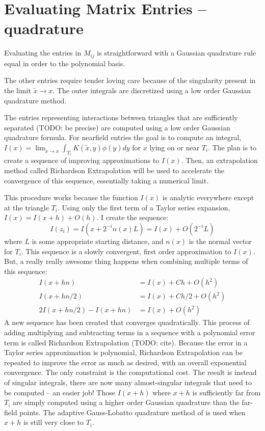 \documentclass[a4paper]{article}
\begin{document}
\section*{Evaluating Matrix Entries -- quadrature}
Evaluating the entries in $M_{ij}$ is straightforward with a Gaussian quadrature rule equal in order to the polynomial basis. 

The other entries require tender loving care because of the singularity present in the limit $\tilde{x} \to x$.
The outer integrals are discretized using a low order Gaussian quadrature method. 

The entries representing interactions between triangles that are sufficiently separated (TODO: be precise) are computed using a low order Gaussian quadrature formula. For nearfield entries the goal is to compute an integral, $I(x) = \lim_{\tilde{x}\to x}\int_{T_i}K(\tilde{x},y)\phi(y)dy$ for $x$ lying on or near $T_i$. The plan is to create a sequence of improving approximations to $I(x)$. Then, an extrapolation method called Richardson Extrapolation will be used to accelerate the convergence of this sequence, essentially taking a numerical limit. 

This procedure works because the function $I(x)$ is analytic everywhere except at the triangle $T_i$. Using only the first term of a Taylor series expansion, $I(x) = I(x + h) + O(h)$. I create the sequence:
\begin{equation}
    I(z_i) = I(x + 2^{-i}n(x)L) = I(x) + O(2^{-i}L)
\end{equation}
where $L$ is some appropriate starting distance, and $n(x)$ is the normal vector for $T_i$. This sequence is a slowly convergent, first order approximation to $I(x)$. But, a really really awesome thing happens when combining multiple terms of this sequence: 
\begin{align}
I(x + hn) &= I(x) + Ch + O(h^2)\\
I(x + hn/2) &= I(x) + Ch/2 + O(h^2)\\
2I(x + hn/2) - I(x + hn) &= I(x) + O(h^2)
\end{align}
A new sequence has been created that converges quadratically. This process of adding multiplying and subtracting terms in a sequence with a polynomial error term is called Richardson Extrapolation (TODO: cite).  Because the error in a Taylor series approximation is polynomial, Richardson Extrapolation can be repeated to improve the error as much as desired, with an overall exponential convergence. The only constraint is the computational cost. The result is instead of singular integrals, there are now many almost-singular integrals that need to be computed -- an easier job! Those $I(x + h)$ where $x + h$ is sufficiently far from $T_i$ are simply computed using a higher order Gaussian quadrature than the far-field points. The adaptive Gauss-Lobatto quadrature method of \citet{Gander2000} is used when $x + h$ is still very close to $T_i$. 
\end{document}
